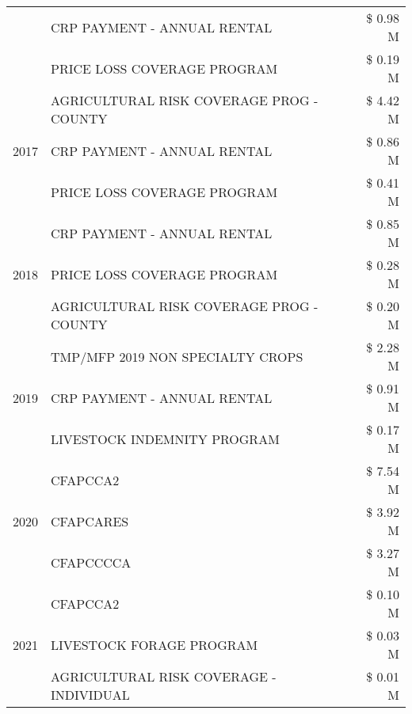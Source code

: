 \begin{tabular}{llr}
 & CRP PAYMENT - ANNUAL RENTAL & \$ 0.98 M \\
 & PRICE LOSS COVERAGE PROGRAM & \$ 0.19 M \\
\cline{1-3}
\multirow[t]{3}{*}{2017} & AGRICULTURAL RISK COVERAGE PROG - COUNTY & \$ 4.42 M \\
 & CRP PAYMENT - ANNUAL RENTAL & \$ 0.86 M \\
 & PRICE LOSS COVERAGE PROGRAM & \$ 0.41 M \\
\cline{1-3}
\multirow[t]{3}{*}{2018} & CRP PAYMENT - ANNUAL RENTAL & \$ 0.85 M \\
 & PRICE LOSS COVERAGE PROGRAM & \$ 0.28 M \\
 & AGRICULTURAL RISK COVERAGE PROG - COUNTY & \$ 0.20 M \\
\cline{1-3}
\multirow[t]{3}{*}{2019} & TMP/MFP 2019 NON SPECIALTY CROPS & \$ 2.28 M \\
 & CRP PAYMENT - ANNUAL RENTAL & \$ 0.91 M \\
 & LIVESTOCK INDEMNITY PROGRAM & \$ 0.17 M \\
\cline{1-3}
\multirow[t]{3}{*}{2020} & CFAPCCA2 & \$ 7.54 M \\
 & CFAPCARES & \$ 3.92 M \\
 & CFAPCCCCA & \$ 3.27 M \\
\cline{1-3}
\multirow[t]{3}{*}{2021} & CFAPCCA2 & \$ 0.10 M \\
 & LIVESTOCK FORAGE PROGRAM & \$ 0.03 M \\
 & AGRICULTURAL RISK COVERAGE - INDIVIDUAL & \$ 0.01 M \\
\cline{1-3}
\bottomrule
\end{tabular}
